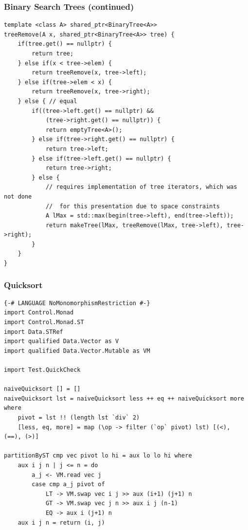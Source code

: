 \documentclass{beamer}
\begin{document}
\begin{frame}[fragile]
\frametitle{Binary Search Trees (continued)}
\begin{Verbatim}[frame=single, fontsize=\scriptsize]
template <class A> shared_ptr<BinaryTree<A>>
treeRemove(A x, shared_ptr<BinaryTree<A>> tree) {
    if(tree.get() == nullptr) {
        return tree;
    } else if(x < tree->elem) {
        return treeRemove(x, tree->left);
    } else if(tree->elem < x) {
        return treeRemove(x, tree->right);
    } else { // equal
        if((tree->left.get() == nullptr) &&
            (tree->right.get() == nullptr)) {
            return emptyTree<A>();
        } else if(tree->right.get() == nullptr) {
            return tree->left;
        } else if(tree->left.get() == nullptr) {
            return tree->right;
        } else {
            // requires implementation of tree iterators, which was not done
            //  for this presentation due to space constraints
            A lMax = std::max(begin(tree->left), end(tree->left));
            return makeTree(lMax, treeRemove(lMax, tree->left), tree->right);
        }
    }
}
\end{Verbatim}
\end{frame}

\begin{frame}[fragile]
\frametitle{Quicksort}
\begin{Verbatim}[frame=single, fontsize=\scriptsize]
{-# LANGUAGE NoMonomorphismRestriction #-}
import Control.Monad
import Control.Monad.ST
import Data.STRef
import qualified Data.Vector as V
import qualified Data.Vector.Mutable as VM

import Test.QuickCheck

naiveQuicksort [] = []
naiveQuicksort lst = naiveQuicksort less ++ eq ++ naiveQuicksort more where
    pivot = lst !! (length lst `div` 2)
    [less, eq, more] = map (\op -> filter (`op` pivot) lst) [(<), (==), (>)]

partitionByST cmp vec pivot lo hi = aux lo lo hi where
    aux i j n | j <= n = do 
        a_j <- VM.read vec j 
        case cmp a_j pivot of
            LT -> VM.swap vec i j >> aux (i+1) (j+1) n
            GT -> VM.swap vec j n >> aux i j (n-1)
            EQ -> aux i (j+1) n
    aux i j n = return (i, j)
\end{Verbatim}
\end{frame}
\end{document}
